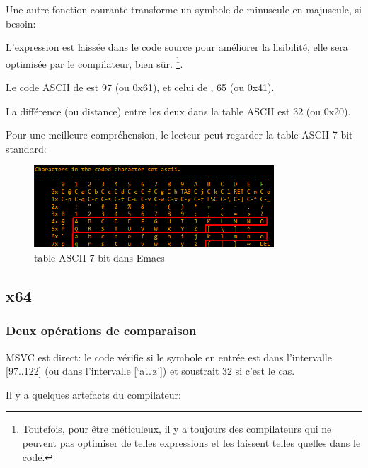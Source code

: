 
Une autre fonction courante transforme un symbole de minuscule en majuscule, si besoin:



L'expression  est laissée dans le code source pour améliorer la lisibilité,
elle sera optimisée par le compilateur, bien sûr.
\footnote{Toutefois, pour être méticuleux, il y a toujours des compilateurs qui ne
peuvent pas optimiser de telles expressions et les laissent telles quelles dans le
code.}.

Le code \ac{ASCII} de  est 97 (ou 0x61), et celui de , 65 (ou 0x41).

La différence (ou distance) entre les deux dans la table \ac{ASCII} est 32 (ou 0x20).

Pour une meilleure compréhension, le lecteur peut regarder la table \ac{ASCII} 7-bit
standard:

\begin{figure}[H]
\centering
\includegraphics[width=0.8\textwidth]{ascii.png}
\caption{table \ac{ASCII} 7-bit dans Emacs}
\end{figure}

\subsection{x64}

\subsubsection{Deux opérations de comparaison}

MSVC \NonOptimizing est direct: le code vérifie si le symbole en entrée est dans
l'intervalle [97..122] (ou dans l'intervalle [`a'..`z']) et soustrait 32 si c'est
le cas.

Il y a quelques artefacts du compilateur:




